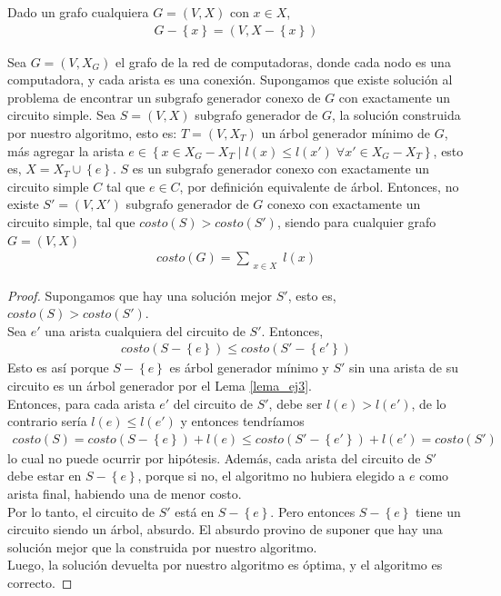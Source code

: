 \begin{notacion}
Dado un grafo cualquiera $G = (V,X)$ con $x \in X$, 
\begin{align*}
G - \left\{x\right\} = (V, X - \left\{x\right\})
\end{align*}
\end{notacion}

\begin{correctitud}
Sea $G = (V,X_G)$ el grafo de la red de computadoras, donde cada nodo es una computadora, y cada arista es una conexión. Supongamos que existe solución al problema de encontrar un subgrafo generador conexo de $G$ con exactamente un circuito simple. Sea $S = (V,X)$ subgrafo generador de $G$, la solución construida por nuestro algoritmo, esto es: $T = (V, X_T)$ un árbol generador mínimo de $G$, más agregar la arista $e \in \left\{x \in X_G - X_T \mid l(x) \leq l(x') \; \forall x' \in X_G - X_T \right\}$, esto es, $X = X_T \cup \left\{e\right\}$. $S$ es un subgrafo generador conexo con exactamente un circuito simple $C$ tal que $e \in C$, por definición equivalente de árbol. Entonces, no existe $S' = (V,X')$ subgrafo generador de $G$ conexo con exactamente un circuito simple, tal que $costo(S) > costo(S')$, siendo para cualquier grafo $G = (V,X)$
\begin{align*}
costo(G) = \sum\limits_{\substack{x \in X}} l(x)
\end{align*}
\end{correctitud}
\begin{proof}
Supongamos que hay una solución mejor $S'$, esto es, $costo(S) > costo(S')$. \\
\noindent Sea $e'$ una arista cualquiera del circuito de $S'$. Entonces,
\begin{align*}
costo(S - \left\{e\right\}) \leq costo(S' - \left\{e'\right\})
\end{align*}
Esto es así porque $S - \left\{e\right\}$ es árbol generador mínimo y $S'$ sin una arista de su circuito es un árbol generador por el Lema \ref{lema_ej3}. \\
Entonces, para cada arista $e'$ del circuito de $S'$, debe ser $l(e) > l(e')$, de lo contrario sería $l(e) \leq l(e')$ y entonces tendríamos 
\begin{align*}
costo(S) = costo(S - \left\{e\right\}) + l(e) \leq costo(S' - \left\{e'\right\}) + l(e') = costo(S')
\end{align*}
lo cual no puede ocurrir por hipótesis.
Además, cada arista del circuito de $S'$ debe estar en $S - \left\{e\right\}$, porque si no, el algoritmo no hubiera elegido a $e$ como arista final, habiendo una de menor costo. \\
Por lo tanto, el circuito de $S'$ está en $S - \left\{e\right\}$. Pero entonces $S - \left\{e\right\}$ tiene un circuito siendo un árbol, absurdo. El absurdo provino de suponer que hay una solución mejor que la construida por nuestro algoritmo. \\
Luego, la solución devuelta por nuestro algoritmo es óptima, y el algoritmo es correcto.
\end{proof}

